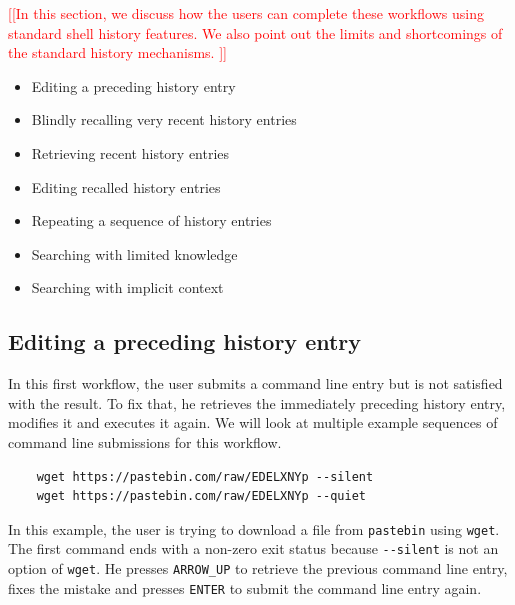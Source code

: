 \documentclass[thesis=M,english]{FITthesis}[2012/10/20]
\newcommand{\redtext}[1]{\textcolor{red}{[[#1]]}}
\begin{document}
\redtext{In this section, we discuss how the users can complete these workflows using standard shell history features. We also point out the limits and shortcomings of the standard history mechanisms. }





\begin{itemize}
    \item Editing a preceding history entry
    \item Blindly recalling very recent history entries
    \item Retrieving recent history entries
    \item Editing recalled history entries
    \item Repeating a sequence of history entries
    \item Searching with limited knowledge
    \item Searching with implicit context
\end{itemize}


\subsection{Editing a preceding history entry}

In this first workflow, the user submits a command line entry but is not satisfied with the result. To fix that, he retrieves the immediately preceding history entry, modifies it and executes it again. We will look at multiple example sequences of command line submissions for this workflow.

\begin{verbatim}
    wget https://pastebin.com/raw/EDELXNYp --silent
    wget https://pastebin.com/raw/EDELXNYp --quiet
\end{verbatim}
In this example, the user is trying to download a file from \verb|pastebin| using \verb|wget|. The first command ends with a non-zero exit status because \verb|--silent| is not an option of \verb|wget|. He presses \verb|ARROW_UP| to retrieve the previous command line entry, fixes the mistake and presses \verb|ENTER| to submit the command line entry again. 
\end{document}

